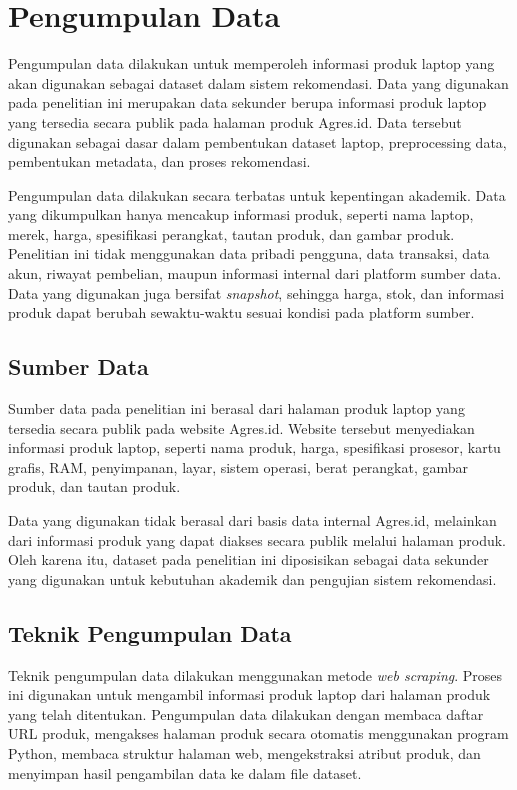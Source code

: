 \section{Pengumpulan Data}
Pengumpulan data dilakukan untuk memperoleh informasi produk laptop yang akan digunakan sebagai dataset dalam sistem rekomendasi. Data yang digunakan pada penelitian ini merupakan data sekunder berupa informasi produk laptop yang tersedia secara publik pada halaman produk Agres.id. Data tersebut digunakan sebagai dasar dalam pembentukan dataset laptop, preprocessing data, pembentukan metadata, dan proses rekomendasi.

Pengumpulan data dilakukan secara terbatas untuk kepentingan akademik. Data yang dikumpulkan hanya mencakup informasi produk, seperti nama laptop, merek, harga, spesifikasi perangkat, tautan produk, dan gambar produk. Penelitian ini tidak menggunakan data pribadi pengguna, data transaksi, data akun, riwayat pembelian, maupun informasi internal dari platform sumber data. Data yang digunakan juga bersifat \textit{snapshot}, sehingga harga, stok, dan informasi produk dapat berubah sewaktu-waktu sesuai kondisi pada platform sumber.

\subsection{Sumber Data}
Sumber data pada penelitian ini berasal dari halaman produk laptop yang tersedia secara publik pada website Agres.id. Website tersebut menyediakan informasi produk laptop, seperti nama produk, harga, spesifikasi prosesor, kartu grafis, RAM, penyimpanan, layar, sistem operasi, berat perangkat, gambar produk, dan tautan produk.

Data yang digunakan tidak berasal dari basis data internal Agres.id, melainkan dari informasi produk yang dapat diakses secara publik melalui halaman produk. Oleh karena itu, dataset pada penelitian ini diposisikan sebagai data sekunder yang digunakan untuk kebutuhan akademik dan pengujian sistem rekomendasi.

\subsection{Teknik Pengumpulan Data}
Teknik pengumpulan data dilakukan menggunakan metode \textit{web scraping}. Proses ini digunakan untuk mengambil informasi produk laptop dari halaman produk yang telah ditentukan. Pengumpulan data dilakukan dengan membaca daftar URL produk, mengakses halaman produk secara otomatis menggunakan program Python, membaca struktur halaman web, mengekstraksi atribut produk, dan menyimpan hasil pengambilan data ke dalam file dataset.

